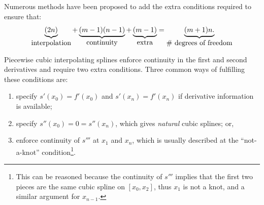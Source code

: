 Numerous methods have been proposed to add the extra conditions required to ensure that:
\[
\underbrace{(2n)}_{\hbox{interpolation}} + \underbrace{(m-1)(n-1)}_{\hbox{continuity}} + \underbrace{(m-1)}_{\hbox{extra}} = \underbrace{(m+1)n.}_{\hbox{\# degrees of freedom}}
\]

\begin{example}
Piecewise cubic interpolating splines enforce continuity in the first and second derivatives and require two extra conditions. Three common ways of fulfilling these conditions are:
\begin{enumerate}
\item specify $s'(x_0)=f'(x_0)$ and $s'(x_n) = f'(x_n)$ if derivative information is available;
\item specify $s''(x_0) = 0 = s''(x_n)$, which gives {\em natural} cubic splines; or,
\item enforce continuity of $s'''$ at $x_1$ and $x_n$, which is usually described at the ``not-a-knot'' condition\footnote{This can be reasoned because the continuity of $s'''$ implies that the first two pieces are the same cubic spline on $[x_0,x_2]$, thus $x_1$ is not a knot, and a similar argument for $x_{n-1}$.}.
\end{enumerate}
\end{example}

